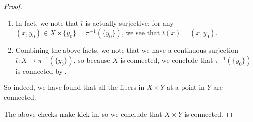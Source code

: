 \documentclass[../notes.tex]{subfiles}
\begin{document}
\begin{proof}
\begin{itemize}
\begin{enumerate}
			\item In fact, we note that $\overline\iota$ is actually surjective: for any $(x,y_0)\in X\times\{y_0\}=\pi^{-1}(\{y_0\})$, we see that $\overline\iota(x)=(x,y_0)$.
			\item Combining the above facts, we note that we have a continuous surjection $\overline\iota\colon X\to\pi^{-1}(\{y_0\})$, so because $X$ is connected, we conclude that $\pi^{-1}(\{y_0\})$ is connected by .
		\end{enumerate}
		So indeed, we have found that all the fibers in $X\times Y$ at a point in $Y$ are connected.
	\end{itemize}
	The above checks make  kick in, so we conclude that $X\times Y$ is connected.
\end{proof}
\end{document}
